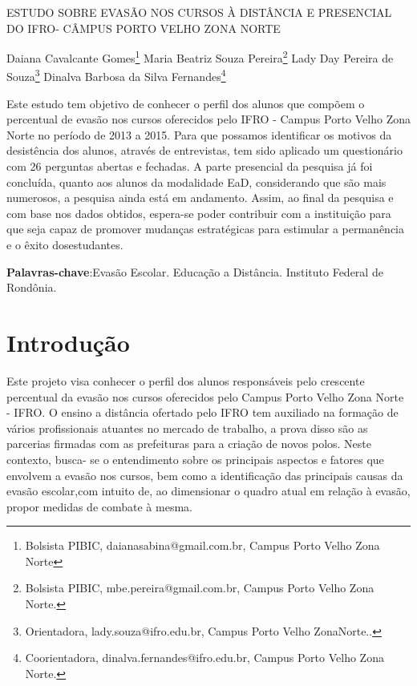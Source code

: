 \documentclass[article,12pt,onesidea,4paper,english,brazil]{abntex2}
\begin{document}
	
	
	\frenchspacing 
	
	\begin{center}
		\LARGE ESTUDO SOBRE EVASÃO NOS CURSOS À DISTÂNCIA E PRESENCIAL DO IFRO- CÂMPUS PORTO VELHO ZONA NORTE
		
		\normalsize
		Daiana Cavalcante Gomes\footnote{Bolsista PIBIC, daianasabina@gmail.com.br, Campus Porto Velho Zona Norte} 
		Maria Beatriz Souza Pereira\footnote{Bolsista PIBIC, mbe.pereira@gmail.com.br, Campus Porto Velho Zona Norte.} 
		Lady Day Pereira de Souza\footnote{Orientadora, lady.souza@ifro.edu.br, Campus Porto Velho ZonaNorte..} 
	Dinalva Barbosa da Silva Fernandes\footnote{Coorientadora, dinalva.fernandes@ifro.edu.br, Campus Porto Velho Zona Norte.} 
	\end{center}
	
	\begin{resumoumacoluna}
	Este estudo tem objetivo de conhecer o perfil dos alunos que compõem o percentual de evasão nos cursos oferecidos pelo IFRO - Campus Porto Velho Zona Norte no período de 2013 a 2015. Para que possamos identificar os motivos da desistência dos alunos, através de entrevistas, tem sido aplicado um questionário com 26 perguntas abertas e fechadas. A parte presencial da pesquisa já foi concluída, quanto aos alunos da modalidade EaD, considerando que são mais numerosos, a pesquisa ainda está em andamento. Assim, ao final da pesquisa e com base nos dados obtidos, espera-se poder contribuir com a instituição para que seja capaz de promover mudanças estratégicas para estimular a permanência e o êxito dosestudantes.
	
	
		
		\vspace{\onelineskip}
		
		\noindent
		\textbf{Palavras-chave}:Evasão Escolar. Educação a Distância. Instituto Federal de Rondônia.
	\end{resumoumacoluna}
	
	\section*{Introdução}
	
	Este projeto visa conhecer o perfil dos alunos responsáveis pelo crescente percentual da evasão nos cursos oferecidos pelo Campus Porto Velho Zona Norte - IFRO. O ensino a distância ofertado pelo IFRO tem auxiliado na formação de vários profissionais atuantes no mercado de trabalho, a prova disso são as parcerias firmadas com as prefeituras para a criação de novos polos. Neste contexto, busca- se o entendimento sobre os principais aspectos e fatores que envolvem a evasão nos cursos, bem como a identificação das principais causas da evasão escolar,com intuito de, ao dimensionar o quadro atual em relação à evasão, propor medidas de combate à mesma.
	
\end{document}
